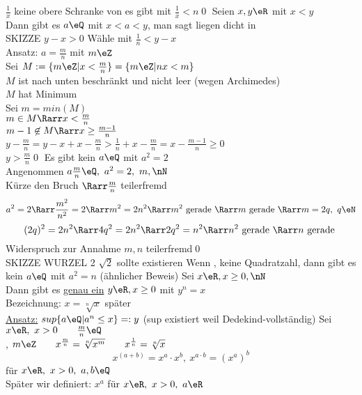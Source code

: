 \begin{enumerate}
$\frac{1}{x}$ keine obere Schranke von \N{} \Rarr{} es gibt \nN{} mit $\frac{1}{x}<n$\qed
%
\Satz
Seien $x,y\eR$ mit $x<y$\\
Dann gibt es $a\eQ$ mit $x<a<y$, man sagt \Q{} liegen dicht in \R\\
SKIZZE %
\bew
$y-x>0$ Wähle \nN{} mit $\frac{1}{n}<y-x$\\
Ansatz: $a=\frac{m}{n}$ mit $m\eZ$\\
Sei $M:=\{m\eZ|x<\frac{m}{n}\}=\{m\eZ|nx<m\}$\\
$M$ ist nach unten beschränkt und nicht leer (wegen Archimedes)\\
$M$ hat Minimum\\
Sei $m=min(M)$\\
$m\in M \Rarr x<\frac{m}{n}$\\
$m-1\not\in M \Rarr x\geq\frac{m-1}{n}$\\
$y-\frac{m}{n} =y-x+x-\frac{m}{n}>\frac{1}{n}+x-\frac{m}{n}=x-\frac{m-1}{n}\geq0$\\
$y>\frac{m}{n}$\qed
%
\Satz
Es gibt kein $a\eQ$ mit $a^2=2$\\
\bew
Angenommen $a\frac{m}{n}\eQ,\ a^2=2,\ m,\nN$\\
Kürze den Bruch $\Rarr \frac{m}{n}$ teilerfremd\\
$$a^2=2\Rarr \frac{m^2}{n^2}=2 \Rarr m^2=2n^2 \Rarr m^2 \text{ gerade } \Rarr m \text{ gerade } \Rarr m=2q,\ q\eN$$
$$(2q)^2=2n^2 \Rarr 4q^2=2n^2 \Rarr 2q^2=n^2 \Rarr  n^2 \text{ gerade } \Rarr n \text{ gerade }$$
Widerspruch zur Annahme $m,n$ teilerfremd\qed\\
SKIZZE WURZEL 2 \Rarr $\sqrt{2}$ sollte existieren %
\bem
Wenn \nN, keine Quadratzahl, dann gibt es kein $a\eQ$ mit $a^2=n$ (ähnlicher Beweis)
%
\Satz
Sei $x\eR, x\geq 0, \nN$\\
Dann gibt es \underline{genau ein} $y\eR, x\geq 0$ mit $y^n=x$\\
Bezeichnung: $x=\sqrt[n]{x}$
\bew
später\\
\underline{Ansatz:} $sup\{a\eQ|a^n\leq x\}=:y$ (sup existiert weil \R{} Dedekind-vollständig)
%
\Def
Sei $x\eR,\ x>0\qquad \frac{m}{n}\eQ$\\
\nN, $m\eZ\qquad x^{\frac{m}{n}}=\sqrt[n]{x^m}\qquad x^{\frac{1}{n}}=\sqrt[n]{x}$\\
 $$x^{(a+b)}=x^a·x^b,\ x^{a·b}=(x^a)^b$$\hfill für $x\eR,\ x>0,\ a,b\eQ$\\
\bem
Später wir definiert: $x^a$ für $x\eR,\ x>0,\ a\eR$
%

\end{enumerate}
